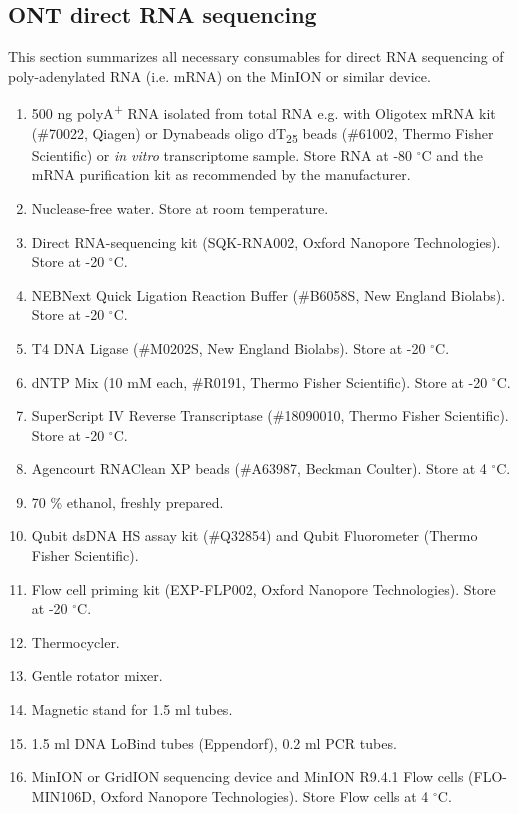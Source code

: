\documentclass[times, 11pt, a4paper]{article}
\begin{document}
\subsection*{ONT direct RNA sequencing}
This section summarizes all necessary consumables for direct RNA sequencing of poly-adenylated RNA (i.e. mRNA) on the MinION or similar device.
\begin{enumerate}
\item 500 ng polyA\textsuperscript{+} RNA isolated from total RNA e.g. with Oligotex mRNA kit (\#70022, Qiagen) or Dynabeads oligo dT\textsubscript{25} beads (\#61002, Thermo Fisher Scientific) or \emph{in vitro} transcriptome sample. Store RNA at -80 $^{\circ}$C and the mRNA purification kit as recommended by the manufacturer.

\item Nuclease-free water. Store at room temperature.

\item Direct RNA-sequencing kit (SQK-RNA002, Oxford Nanopore Technologies). Store at -20 $^{\circ}$C.

\item NEBNext Quick Ligation Reaction Buffer (\#B6058S, New England Biolabs). Store at -20 $^{\circ}$C.

\item T4 DNA Ligase (\#M0202S, New England Biolabs). Store at -20 $^{\circ}$C.

\item dNTP Mix (10 mM each, \#R0191, Thermo Fisher Scientific). Store at -20 $^{\circ}$C.

\item SuperScript IV Reverse Transcriptase (\#18090010, Thermo Fisher Scientific). Store at -20 $^{\circ}$C.

\item Agencourt RNAClean XP beads (\#A63987, Beckman Coulter). Store at 4 $^{\circ}$C.

\item 70 \% ethanol, freshly prepared. 

\item Qubit dsDNA HS assay kit (\#Q32854) and Qubit Fluorometer (Thermo Fisher Scientific).

\item Flow cell priming kit (EXP-FLP002, Oxford Nanopore Technologies). Store at -20 $^{\circ}$C.

\item Thermocycler.

\item Gentle rotator mixer.

\item Magnetic stand for 1.5 ml tubes.

\item 1.5 ml DNA LoBind tubes (Eppendorf), 0.2  ml PCR tubes.

\item MinION or GridION sequencing device and MinION R9.4.1 Flow cells (FLO-MIN106D, Oxford Nanopore Technologies). Store Flow cells at 4 $^{\circ}$C.
\end{enumerate}
\end{document}

